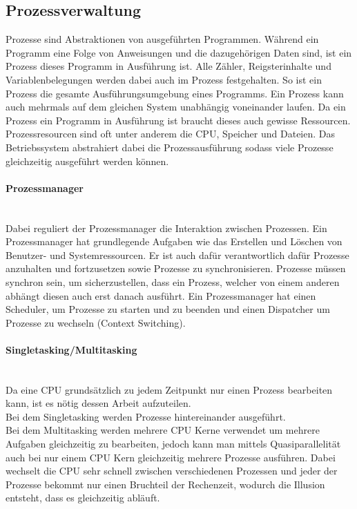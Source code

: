 \documentclass{article}
\newcommand{\paragraphlb}[1]{\paragraph{#1}\mbox{}\\}
\begin{document}
	\subsection{Prozessverwaltung}
	Prozesse sind Abstraktionen von ausgeführten Programmen. Während ein Programm eine Folge von Anweisungen und die dazugehörigen Daten sind, ist ein Prozess dieses Programm in Ausführung ist. Alle Zähler, Reigsterinhalte und Variablenbelegungen werden dabei auch im Prozess festgehalten. So ist ein Prozess die gesamte Ausführungsumgebung eines Programms. Ein Prozess kann auch mehrmals auf dem gleichen System unabhängig voneinander laufen. Da ein Prozess ein Programm in Ausführung ist braucht dieses auch gewisse Ressourcen. Prozessresourcen sind oft unter anderem die CPU, Speicher und Dateien. Das Betriebssystem abstrahiert dabei die Prozessausführung sodass viele Prozesse gleichzeitig ausgeführt werden können. \\
	\paragraphlb{Prozessmanager}
	Dabei reguliert der Prozessmanager die Interaktion zwischen Prozessen. Ein Prozessmanager hat grundlegende Aufgaben wie das Erstellen und Löschen von Benutzer- und Systemressourcen. Er ist auch dafür verantwortlich dafür Prozesse anzuhalten und fortzusetzen sowie Prozesse zu synchronisieren. Prozesse müssen synchron sein, um sicherzustellen, dass ein Prozess, welcher von einem anderen abhängt diesen auch erst danach ausführt. Ein Prozessmanager hat einen Scheduler, um Prozesse zu starten und zu beenden und einen Dispatcher um Prozesse zu wechseln (Context Switching).
	\paragraphlb{Singletasking/Multitasking}
	Da eine CPU grundsätzlich zu jedem Zeitpunkt nur einen Prozess bearbeiten kann, ist es nötig dessen Arbeit aufzuteilen. \\
	Bei dem Singletasking werden Prozesse hintereinander ausgeführt. \\
	Bei dem Multitasking werden mehrere CPU Kerne verwendet um mehrere Aufgaben gleichzeitig zu bearbeiten, jedoch kann man mittels Quasiparallelität auch bei nur einem CPU Kern gleichzeitig mehrere Prozesse ausführen. Dabei wechselt die CPU sehr schnell zwischen verschiedenen Prozessen und jeder der Prozesse bekommt nur einen Bruchteil der Rechenzeit, wodurch die Illusion entsteht, dass es gleichzeitig abläuft. \\
\end{document}
